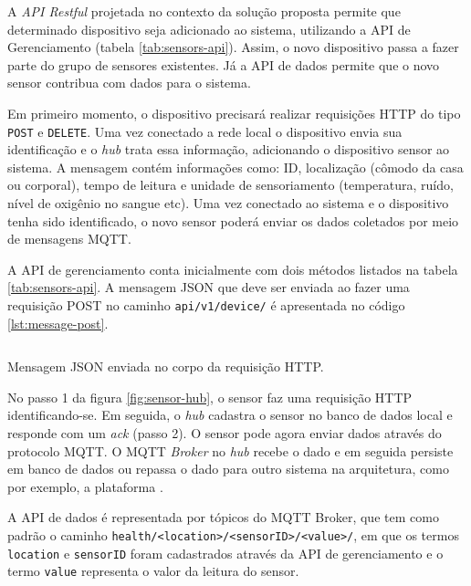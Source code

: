 A \textit{API Restful} projetada no contexto da solução proposta permite que determinado
dispositivo seja adicionado ao sistema, utilizando a API de Gerenciamento (tabela
\ref{tab:sensors-api}). 
Assim, o novo dispositivo passa a fazer parte do grupo de sensores existentes.
Já a API de dados permite que o novo sensor contribua com dados para o sistema.


Em primeiro momento, o dispositivo precisará realizar requisições HTTP do tipo
\texttt{POST} e \texttt{DELETE}. Uma vez conectado a rede local o dispositivo envia sua
identificação e o \textit{hub} trata essa informação, adicionando o dispositivo
sensor ao sistema. A mensagem contém informações como: ID, localização (cômodo da casa
ou corporal), tempo de leitura e unidade de sensoriamento (temperatura, ruído,
nível de oxigênio no sangue etc). Uma vez conectado ao sistema e o dispositivo
tenha sido identificado, o novo sensor poderá enviar os dados coletados por meio de
mensagens MQTT. 

A API de gerenciamento conta inicialmente com dois métodos listados na tabela
\ref{tab:sensors-api}. A mensagem JSON que deve ser enviada ao fazer uma
requisição POST no caminho \texttt{api/v1/device/} é apresentada no código
\ref{lst:message-post}.

\begin{listing}[ht!]
\inputminted{json}{codigos/message-post.json}
\caption{Mensagem JSON enviada no corpo da requisição HTTP.}
\label{lst:message-post}
\end{listing}

No passo 1 da figura \ref{fig:sensor-hub}, o sensor faz uma requisição HTTP
identificando-se. Em seguida, o \textit{hub} cadastra o sensor no banco de dados
local e responde com um \textit{ack} (passo 2). O sensor pode agora enviar
dados através do protocolo MQTT. O MQTT \textit{Broker} no \textit{hub} recebe
o dado e em seguida persiste em banco de dados ou repassa o dado para outro
sistema na arquitetura, como por exemplo, a plataforma \nextsaude.


A API de dados é representada por tópicos do MQTT Broker, que tem como padrão
o caminho \texttt{health/<location>/<sensorID>/<value>/}, em que os termos 
\texttt{location} e \texttt{sensorID} foram cadastrados através da API de
gerenciamento e o termo \texttt{value} representa o valor da leitura do sensor.

